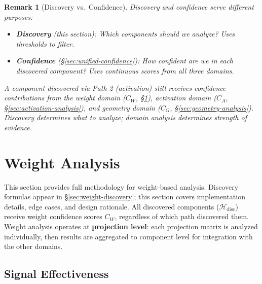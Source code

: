 \documentclass[11pt]{article}
\newtheorem{remark}{Remark}[section]
\begin{document}
\begin{remark}[Discovery vs.\ Confidence]
\label{rem:discovery-vs-confidence}
Discovery and confidence serve different purposes:
\begin{itemize}[nosep]
\item \textbf{Discovery} (this section): Which components should we analyze? Uses thresholds to filter.
\item \textbf{Confidence} (\S\ref{sec:unified-confidence}): How confident are we in each discovered component? Uses continuous scores from all three domains.
\end{itemize}
A component discovered via Path 2 (activation) still receives confidence contributions from the weight domain ($C_W$, \S\ref{sec:weight-analysis}), activation domain ($C_A$, \S\ref{sec:activation-analysis}), and geometry domain ($C_G$, \S\ref{sec:geometry-analysis}). Discovery determines \emph{what} to analyze; domain analysis determines \emph{strength of evidence}.
\end{remark}

\section{Weight Analysis}
\label{sec:weight-analysis}

This section provides full methodology for weight-based analysis. Discovery formulas appear in \S\ref{sec:weight-discovery}; this section covers implementation details, edge cases, and design rationale. All discovered components ($\mathcal{H}_{\text{disc}}$) receive weight confidence scores $C_W$, regardless of which path discovered them. Weight analysis operates at \textbf{projection level}: each projection matrix is analyzed individually, then results are aggregated to component level for integration with the other domains.

\subsection{Signal Effectiveness}
\end{document}
